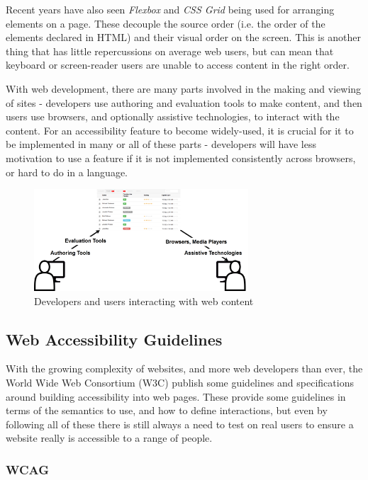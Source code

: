 \documentclass[ %
                    author={Aleena Baig},
                supervisor={Dr Simon Lock},
                    degree={BSc},
                     title={On Making Web Accessible Graphs},
                  subtitle={},
                      year={2019} ]{dissertation}
\begin{document}
Recent years have also seen \textit{Flexbox} and \textit{CSS Grid} being used for arranging elements on a page. These decouple the source order (i.e. the order of the elements declared in HTML) and their visual order on the screen. This is another thing that has little repercussions on average web users, but can mean that keyboard or screen-reader users are unable to access content in the right order.


With web development, there are many parts involved in the making and viewing of sites - developers use authoring and evaluation tools to make content, and then users use browsers, and optionally assistive technologies, to interact with the content. For an accessibility feature to become widely-used, it is crucial for it to be implemented in many or all of these parts - developers will have less motivation to use a feature if it is not implemented consistently across browsers, or hard to do in a language.

\begin{figure}[h]
\caption{Developers and users interacting with web content}
\includegraphics[width=8cm]{images/W3Components.png}
\centering
\end{figure}

\subsection{Web Accessibility Guidelines}
With the growing complexity of websites, and more web developers than ever, the World Wide Web Consortium (W3C) publish some guidelines and specifications around building accessibility into web pages.
These provide some guidelines in terms of the semantics to use, and how to define interactions, but even by following all of these there is still always a need to test on real users to ensure a website really is accessible to a range of people.

\subsubsection{WCAG}
\end{document}
